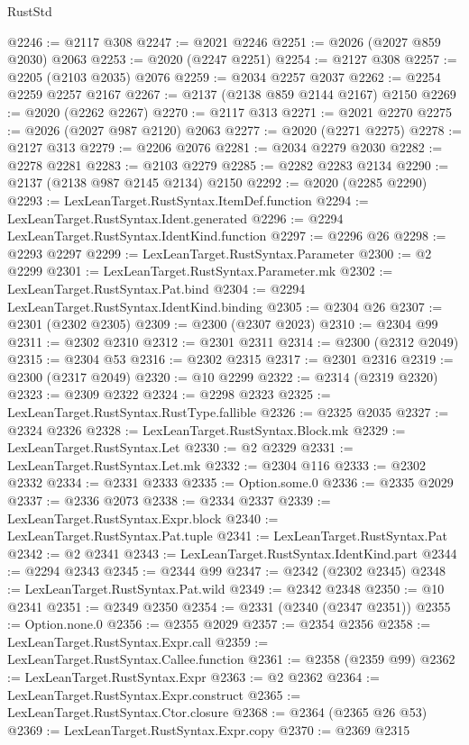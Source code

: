 \begin{lexlean}{RustStd}
\begin{coremodule}
@2246 := @2117 @308
@2247 := @2021 @2246
@2251 := @2026 (@2027 @859 @2030) @2063
@2253 := @2020 (@2247 @2251)
@2254 := @2127 @308
@2257 := @2205 (@2103 @2035) @2076
@2259 := @2034 @2257 @2037
@2262 := @2254 @2259 @2257 @2167
@2267 := @2137 (@2138 @859 @2144 @2167) @2150
@2269 := @2020 (@2262 @2267)
@2270 := @2117 @313
@2271 := @2021 @2270
@2275 := @2026 (@2027 @987 @2120) @2063
@2277 := @2020 (@2271 @2275)
@2278 := @2127 @313
@2279 := @2206 @2076
@2281 := @2034 @2279 @2030
@2282 := @2278 @2281
@2283 := @2103 @2279
@2285 := @2282 @2283 @2134
@2290 := @2137 (@2138 @987 @2145 @2134) @2150
@2292 := @2020 (@2285 @2290)
@2293 := LexLeanTarget.RustSyntax.ItemDef.function
@2294 := LexLeanTarget.RustSyntax.Ident.generated
@2296 := @2294 LexLeanTarget.RustSyntax.IdentKind.function
@2297 := @2296 @26
@2298 := @2293 @2297
@2299 := LexLeanTarget.RustSyntax.Parameter
@2300 := @2 @2299
@2301 := LexLeanTarget.RustSyntax.Parameter.mk
@2302 := LexLeanTarget.RustSyntax.Pat.bind
@2304 := @2294 LexLeanTarget.RustSyntax.IdentKind.binding
@2305 := @2304 @26
@2307 := @2301 (@2302 @2305)
@2309 := @2300 (@2307 @2023)
@2310 := @2304 @99
@2311 := @2302 @2310
@2312 := @2301 @2311
@2314 := @2300 (@2312 @2049)
@2315 := @2304 @53
@2316 := @2302 @2315
@2317 := @2301 @2316
@2319 := @2300 (@2317 @2049)
@2320 := @10 @2299
@2322 := @2314 (@2319 @2320)
@2323 := @2309 @2322
@2324 := @2298 @2323
@2325 := LexLeanTarget.RustSyntax.RustType.fallible
@2326 := @2325 @2035
@2327 := @2324 @2326
@2328 := LexLeanTarget.RustSyntax.Block.mk
@2329 := LexLeanTarget.RustSyntax.Let
@2330 := @2 @2329
@2331 := LexLeanTarget.RustSyntax.Let.mk
@2332 := @2304 @116
@2333 := @2302 @2332
@2334 := @2331 @2333
@2335 := Option.some.{0}
@2336 := @2335 @2029
@2337 := @2336 @2073
@2338 := @2334 @2337
@2339 := LexLeanTarget.RustSyntax.Expr.block
@2340 := LexLeanTarget.RustSyntax.Pat.tuple
@2341 := LexLeanTarget.RustSyntax.Pat
@2342 := @2 @2341
@2343 := LexLeanTarget.RustSyntax.IdentKind.part
@2344 := @2294 @2343
@2345 := @2344 @99
@2347 := @2342 (@2302 @2345)
@2348 := LexLeanTarget.RustSyntax.Pat.wild
@2349 := @2342 @2348
@2350 := @10 @2341
@2351 := @2349 @2350
@2354 := @2331 (@2340 (@2347 @2351))
@2355 := Option.none.{0}
@2356 := @2355 @2029
@2357 := @2354 @2356
@2358 := LexLeanTarget.RustSyntax.Expr.call
@2359 := LexLeanTarget.RustSyntax.Callee.function
@2361 := @2358 (@2359 @99)
@2362 := LexLeanTarget.RustSyntax.Expr
@2363 := @2 @2362
@2364 := LexLeanTarget.RustSyntax.Expr.construct
@2365 := LexLeanTarget.RustSyntax.Ctor.closure
@2368 := @2364 (@2365 @26 @53)
@2369 := LexLeanTarget.RustSyntax.Expr.copy
@2370 := @2369 @2315

\end{coremodule}
\end{lexlean}

